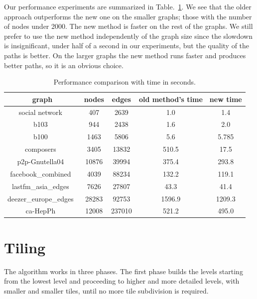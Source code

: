 \documentclass{gd-llncs}
\begin{document}
{Our performance experiments are summarized in Table.~\ref{tab:perf}. We see that the older approach outperforms the new one on the smaller graphs; those with the number of nodes under 2000. The new method is faster on the rest of the graphs. We still prefer to use the new method independently of the graph size since the slowdown is insignificant, under half of a second in our experiments, but the quality of the paths is better. On the larger graphs the new method runs faster and produces better paths, so it is an obvious choice.
\begin{table}
  \begin{center}
    \begin{tabular}{||c |c| c| c| c||}
      \hline
      graph                                   & nodes & edges  & old method's time & new time \\ [0.5ex]
      \hline\hline
      social network~\cite{beveridge2018game} & 407   & 2639   & 1.0               & 1.4      \\
      \hline
      b103~\cite{b103}                        & 944   & 2438   & 1.6               & 2.0      \\
      \hline
      b100~\cite{b100}                        & 1463  & 5806   & 5.6               & 5.785    \\
      \hline
      composers~\cite{composers}              & 3405  & 13832  & 510.5             & 17.5     \\
      \hline
      p2p-Gnutella04~\cite{gnutella}          & 10876 & 39994  & 375.4             & 293.8    \\
      \hline
      facebook\_combined~\cite{fb}            & 4039  & 88234  & 132.2             & 119.1    \\
      \hline
      lastfm\_asia\_edges~\cite{feather}      & 7626  & 27807  & 43.3              & 41.4     \\
      \hline
      deezer\_europe\_edges~\cite{feather}    & 28283 & 92753  & 1596.9            & 1209.3   \\
      \hline
      ca-HepPh~\cite{leskovec2007graph}       & 12008 & 237010 & 521.2             & 495.0    \\
      \hline
    \end{tabular}
    \caption{Performance comparison with time in seconds.}
    \label{tab:perf}
  \end{center}

\end{table}
\section{Tiling}
The algorithm works in three phases. The first phase builds the levels starting from the lowest level and proceeding to higher and more detailed levels, with smaller and smaller tiles, until no more tile subdivision is required. 

}
\end{document}
